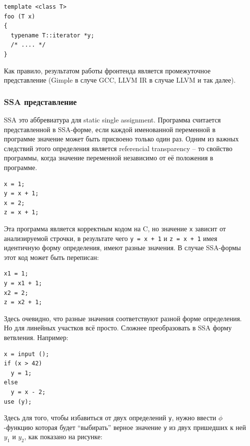 \documentclass[a4paper,12pt,oneside]{article}
\begin{document}
\begin{lstlisting}
template <class T>
foo (T x)
{
  typename T::iterator *y;
  /* .... */
}
\end{lstlisting}

Как правило, результатом работы фронтенда является промежуточное представление (Gimple в случе GCC, LLVM IR в случае LLVM и так далее).

\subsubsection{SSA представление}\label{subsubsec:SSA}

SSA это аббревиатура для static single assignment. Программа считается представленной в SSA-форме, если каждой именованной переменной в программе значение может быть присвоено только один раз. Одним из важных следствий этого определения является referencial transparency -- то свойство программы, когда значение переменной независимо от её положения в программе.

\begin{lstlisting}
x = 1;
y = x + 1;
x = 2;
z = x + 1;
\end{lstlisting}

Эта программа является корректным кодом на C, но значение \lstinline!x! зависит от анализируемой строчки, в результате чего \lstinline!y = x + 1! и \lstinline!z = x + 1! имея идентичную форму определения, имеют разные значения. В случае SSA-формы этот код может быть переписан:

\begin{lstlisting}
x1 = 1;
y = x1 + 1;
x2 = 2;
z = x2 + 1;
\end{lstlisting}

Здесь очевидно, что разные значения соответствуют разной форме определения. Но для линейных участков всё просто. Сложнее преобразовать в SSA форму ветвления. Например:

\begin{lstlisting}
x = input ();
if (x > 42)
  y = 1;
else
  y = x - 2;
use (y);
\end{lstlisting}

Здесь для того, чтобы избавиться от двух определений \lstinline!y!, нужно ввести $\phi$-функцию которая будет ``выбирать'' верное значение \lstinline!y! из двух пришедших к ней $y_1$ и $y_2$, как показано на рисунке:
\end{document}
